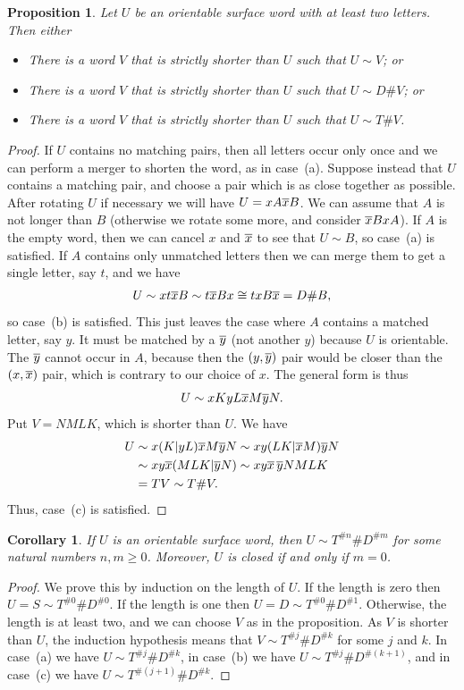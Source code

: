 \documentclass[reqno]{amsart}
\newtheorem{proposition}[theorem]{Proposition}
\newtheorem{corollary}[theorem]{Corollary}
\theoremstyle{definition}
\begin{document}
\begin{proposition}\label{prop-classify-step}
 Let $U$ be an orientable surface word with at least two letters.
 Then either 
 \begin{itemize}
  \item[(a)] There is a word $V$ that is strictly shorter than $U$
   such that $U\sim V$; or 
  \item[(b)] There is a word $V$ that is strictly shorter than $U$
   such that $U\sim D\# V$; or
  \item[(c)] There is a word $V$ that is strictly shorter than $U$
   such that $U\sim T\# V$.
 \end{itemize}
\end{proposition}
\begin{proof}
 If $U$ contains no matching pairs, then all letters occur only once
 and we can perform a merger to shorten the word, as in case~(a).
 Suppose instead that $U$ contains a matching pair, and choose a pair
 which is as close together as possible.  After rotating $U$ if
 necessary we will have $U=xA\overline{x} B$.  We can assume that $A$ is not
 longer than $B$ (otherwise we rotate some more, and consider
 $\overline{x} BxA$).  If $A$ is the empty word, then we can cancel $x$ and
 $\overline{x}$ to see that $U\sim B$, so case~(a) is satisfied.  If $A$
 contains only unmatched letters then we can merge them to get a
 single letter, say $t$, and we have 
 \[ U\sim xt\overline{x} B\sim t\overline{x} Bx \cong txB\overline{x} = D\# B, \]
 so case~(b) is satisfied.  This just leaves the case where $A$
 contains a matched letter, say $y$.  It must be matched by a $\overline{y}$
 (not another $y$) because $U$ is orientable.  The $\overline{y}$ cannot occur
 in $A$, because then the $(y,\overline{y})$ pair would be closer than the
 $(x,\overline{x})$ pair, which is contrary to our choice of $x$.  The general
 form is thus 
 \[ U \sim x K y L \overline{x} M \overline{y} N. \]
 Put $V=NMLK$, which is shorter than $U$.  We have
 \begin{align*}
  U &\sim x(K|yL)\overline{x} M\overline{y} N
     \sim xy(LK|\overline{x} M)\overline{y} N \\
    &\sim xy\overline{x}(MLK|\overline{y} N) 
     \sim xy\overline{x}\,\overline{y} NMLK \\
    &= TV \sim T\# V.
 \end{align*}
 Thus, case~(c) is satisfied.
\end{proof}

\begin{corollary}\label{cor-classify-orientable}
 If $U$ is an orientable surface word, then
 $U\sim T^{\# n}\# D^{\# m}$ for some natural numbers $n,m\geq 0$.
 Moreover, $U$ is closed if and only if $m=0$.
\end{corollary}
\begin{proof}
 We prove this by induction on the length of $U$.  If the length is
 zero then $U=S\sim T^{\# 0}\# D^{\# 0}$.  If the length is one then
 $U=D\sim T^{\# 0}\# D^{\# 1}$.  Otherwise, the length is at least
 two, and we can choose $V$ as in the proposition.  As $V$ is shorter
 than $U$, the induction hypothesis means that
 $V\sim T^{\# j}\# D^{\# k}$ for some $j$ and $k$.  In case~(a) we
 have $U\sim T^{\# j}\# D^{\# k}$, in case~(b) we have
 $U\sim T^{\# j}\# D^{\#(k+1)}$, and in case~(c) we have
 $U\sim T^{\#(j+1)}\# D^{\# k}$.
\end{proof}
\end{document}
